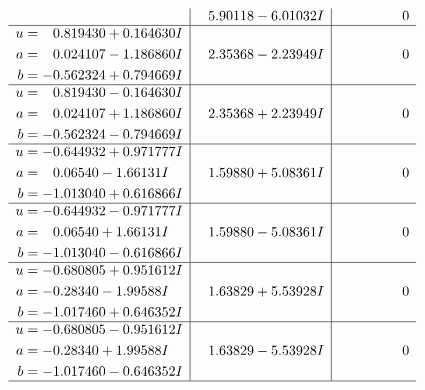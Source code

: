 \documentclass[1p]{elsarticle_modified}
\theoremstyle{definition}
\begin{document}
$$\begin{array}{c|c|c}
 & \phantom{-}5.90118 - 6.01032 I & \phantom{-0.000000 } 0 \\ \hline\begin{aligned}
u &= \phantom{-}0.819430 + 0.164630 I \\
a &= \phantom{-}0.024107 - 1.186860 I \\
b &= -0.562324 + 0.794669 I\end{aligned}
 & \phantom{-}2.35368 - 2.23949 I & \phantom{-0.000000 } 0 \\ \hline\begin{aligned}
u &= \phantom{-}0.819430 - 0.164630 I \\
a &= \phantom{-}0.024107 + 1.186860 I \\
b &= -0.562324 - 0.794669 I\end{aligned}
 & \phantom{-}2.35368 + 2.23949 I & \phantom{-0.000000 } 0 \\ \hline\begin{aligned}
u &= -0.644932 + 0.971777 I \\
a &= \phantom{-}0.06540 - 1.66131 I \\
b &= -1.013040 + 0.616866 I\end{aligned}
 & \phantom{-}1.59880 + 5.08361 I & \phantom{-0.000000 } 0 \\ \hline\begin{aligned}
u &= -0.644932 - 0.971777 I \\
a &= \phantom{-}0.06540 + 1.66131 I \\
b &= -1.013040 - 0.616866 I\end{aligned}
 & \phantom{-}1.59880 - 5.08361 I & \phantom{-0.000000 } 0 \\ \hline\begin{aligned}
u &= -0.680805 + 0.951612 I \\
a &= -0.28340 - 1.99588 I \\
b &= -1.017460 + 0.646352 I\end{aligned}
 & \phantom{-}1.63829 + 5.53928 I & \phantom{-0.000000 } 0 \\ \hline\begin{aligned}
u &= -0.680805 - 0.951612 I \\
a &= -0.28340 + 1.99588 I \\
b &= -1.017460 - 0.646352 I\end{aligned}
 & \phantom{-}1.63829 - 5.53928 I & \phantom{-0.000000 } 0\\
 \hline 
 \end{array}$$\newpage$$\begin{array}{c|c|c}  

\end{array}$$
\end{document}
